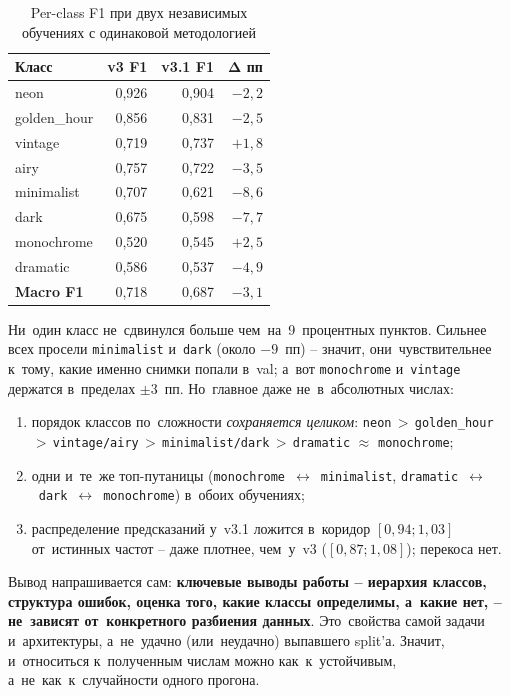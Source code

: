 \documentclass[a4paper,12pt]{diplom}
\begin{document}
\begin{table}[!ht]
\caption{Per-class F1 при двух независимых обучениях с одинаковой методологией}
\label{tab:robustness}
\centering
\begin{tabular}{lrrr}
\toprule
\textbf{Класс} & \textbf{v3 F1} & \textbf{v3.1 F1} & $\boldsymbol{\Delta}$ \textbf{пп} \\
\midrule
neon         & 0{,}926 & 0{,}904 & $-2{,}2$ \\
golden\_hour & 0{,}856 & 0{,}831 & $-2{,}5$ \\
vintage      & 0{,}719 & 0{,}737 & $+1{,}8$ \\
airy         & 0{,}757 & 0{,}722 & $-3{,}5$ \\
minimalist   & 0{,}707 & 0{,}621 & $-8{,}6$ \\
dark         & 0{,}675 & 0{,}598 & $-7{,}7$ \\
monochrome   & 0{,}520 & 0{,}545 & $+2{,}5$ \\
dramatic     & 0{,}586 & 0{,}537 & $-4{,}9$ \\
\midrule
\textbf{Macro F1} & 0{,}718 & 0{,}687 & $-3{,}1$ \\
\bottomrule
\end{tabular}
\end{table}

Ни~один класс не~сдвинулся больше чем~на~9~процентных пунктов. Сильнее всех просели \texttt{minimalist} и~\texttt{dark} (около $-9$~пп) -- значит, они~чувствительнее к~тому, какие именно снимки попали в~val; а~вот \texttt{monochrome} и~\texttt{vintage} держатся в~пределах $\pm 3$~пп. Но~главное даже не~в~абсолютных числах:
\begin{enumerate}[label=\arabic{enumi})]
\item порядок классов по~сложности \emph{сохраняется целиком}: \texttt{neon}\,$>$\,\texttt{golden\_hour}\,$>$\,\texttt{vintage/airy}\,$>$\,\texttt{minimalist/dark}\,$>$\,\texttt{dramatic} $\approx$ \texttt{monochrome};
\item одни и~те~же топ-путаницы (\texttt{monochrome}~$\leftrightarrow$~\texttt{minimalist}, \texttt{dramatic}~$\leftrightarrow$~\texttt{dark}~$\leftrightarrow$~\texttt{monochrome}) в~обоих обучениях;
\item распределение предсказаний у~v3.1 ложится в~коридор $[0{,}94;1{,}03]$ от~истинных частот -- даже плотнее, чем~у~v3 ($[0{,}87;1{,}08]$); перекоса нет.
\end{enumerate}

Вывод напрашивается сам: \textbf{ключевые выводы работы -- иерархия классов, структура ошибок, оценка того, какие классы определимы, а~какие нет, -- не~зависят от~конкретного разбиения данных}. Это~свойства самой задачи и~архитектуры, а~не~удачно (или~неудачно) выпавшего split'а. Значит, и~относиться к~полученным числам можно как~к~устойчивым, а~не~как~к~случайности одного прогона.
\end{document}
